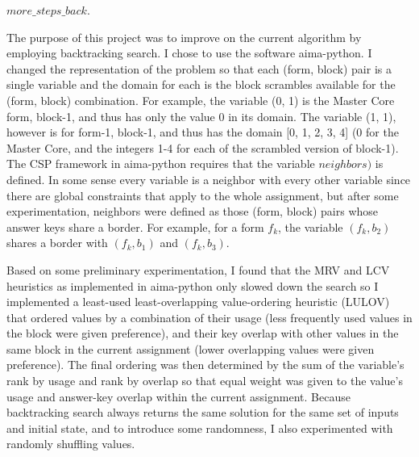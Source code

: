 \documentclass[11pt]{article}
\begin{document}
$\mathit{more\_steps\_back}$.
\par
The purpose of this project was to improve on the current algorithm by
employing backtracking search.  I chose to use the software
aima-python\cite{aima-python}.  I changed the representation of the
problem so that each (form, block) pair is a single variable and the
domain for each is the block scrambles available for the (form, block)
combination. For example, the variable (0, 1) is the Master Core form,
block-1, and thus has only the value 0 in its domain.  The variable
(1, 1), however is for form-1, block-1, and thus has the domain [0, 1,
2, 3, 4] (0 for the Master Core, and the integers 1-4 for each of the
scrambled version of block-1). The CSP framework in aima-python
requires that the variable \(\mathit{neighbors)}\)
is defined. In some sense every variable is a neighbor with every
other variable since there are global constraints that apply to the
whole assignment, but after some experimentation, neighbors were
defined as those (form, block) pairs whose answer keys share a
border. For example, for a form \(f_k\),
the variable \((f_k, b_2)\)
shares a border with \((f_k, b_1)\) and \((f_k, b_3)\).
\par
Based on some preliminary experimentation, I found that the MRV and
LCV heuristics as implemented in aima-python only slowed down the
search so I implemented a least-used least-overlapping value-ordering
heuristic (LULOV) that ordered values by a combination of their usage
(less frequently used values in the block were given preference), and
their key overlap with other values in the same block in the current
assignment (lower overlapping values were given preference). The final
ordering was then determined by the sum of the variable's rank by
usage and rank by overlap so that equal weight was given to the
value's usage and answer-key overlap within the current assignment.
Because backtracking search always returns the same solution for the
same set of inputs and initial state, and to introduce some
randomness, I also experimented with randomly shuffling values.
\end{document}
